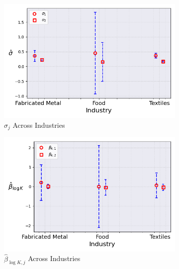 \documentclass{article}
\begin{document}
\begin{figure}[ht!]
    \begin{subfigure}[t]{0.32\textwidth}
        \centering
        \includegraphics[width=\textwidth]{figure/stationary_mixture_kmshare_ciiu_sigma_across_industries_m2.png}
        \caption{$\hat\sigma_j$ Across Industries}
    \end{subfigure}
    \begin{subfigure}[t]{0.32\textwidth}
        \centering
        \includegraphics[width=\textwidth]{figure/stationary_mixture_kmshare_ciiu_beta_k_across_industries_m2.png}
        \caption{$\hat{\beta}_{\log K, j}$ Across Industries}
    \end{subfigure}
    \begin{subfigure}[t]{0.32\textwidth}
        \centering

\end{subfigure}
\end{figure}
\end{document}
